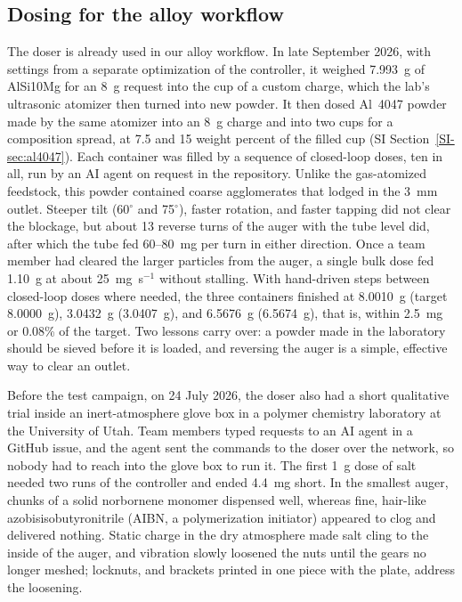 \documentclass[twoside,twocolumn,9pt]{article}
\newcommand{\siref}[1]{\ref*{SI-#1}}
\begin{document}
\subsection{Dosing for the alloy workflow}
\label{sec:alloy}

The doser is already used in our alloy workflow. In late September 2026, with settings from a separate optimization of the controller, it weighed 7.993~g of AlSi10Mg for an 8~g request into the cup of a custom charge, which the lab's ultrasonic atomizer then turned into new powder. It then dosed Al~4047 powder made by the same atomizer into an 8~g charge and into two cups for a composition spread, at 7.5 and 15 weight percent of the filled cup (SI Section~\siref{sec:al4047}). Each container was filled by a sequence of closed-loop doses, ten in all, run by an AI agent on request in the repository. Unlike the gas-atomized feedstock, this powder contained coarse agglomerates that lodged in the 3~mm outlet. Steeper tilt (60$^\circ$ and 75$^\circ$), faster rotation, and faster tapping did not clear the blockage, but about 13 reverse turns of the auger with the tube level did, after which the tube fed 60--80~mg per turn in either direction. Once a team member had cleared the larger particles from the auger, a single bulk dose fed 1.10~g at about 25~mg~s$^{-1}$ without stalling. With hand-driven steps between closed-loop doses where needed, the three containers finished at 8.0010~g (target 8.0000~g), 3.0432~g (3.0407~g), and 6.5676~g (6.5674~g), that is, within 2.5~mg or 0.08\% of the target. Two lessons carry over: a powder made in the laboratory should be sieved before it is loaded, and reversing the auger is a simple, effective way to clear an outlet.

Before the test campaign, on 24 July 2026, the doser also had a short qualitative trial inside an inert-atmosphere glove box in a polymer chemistry laboratory at the University of Utah. Team members typed requests to an AI agent in a GitHub issue, and the agent sent the commands to the doser over the network, so nobody had to reach into the glove box to run it. The first 1~g dose of salt needed two runs of the controller and ended 4.4~mg short. In the smallest auger, chunks of a solid norbornene monomer dispensed well, whereas fine, hair-like azobisisobutyronitrile (AIBN, a polymerization initiator) appeared to clog and delivered nothing. Static charge in the dry atmosphere made salt cling to the inside of the auger, and vibration slowly loosened the nuts until the gears no longer meshed; locknuts, and brackets printed in one piece with the plate, address the loosening.
\end{document}
